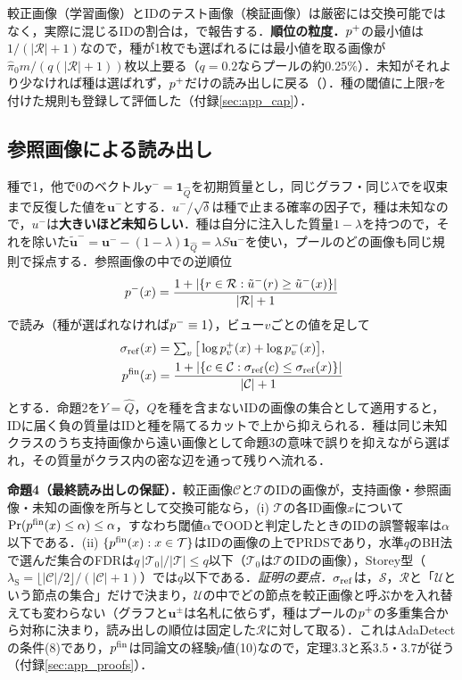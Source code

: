 較正画像（学習画像）とIDのテスト画像（検証画像）は厳密には交換可能ではなく，実際に混じるIDの割合は，で報告する．\textbf{順位の粒度．}$p^{+}$の最小値は$1/(|\mathcal{R}|+1)$なので，種が1枚でも選ばれるには最小値を取る画像が$\hat{\pi}_0 m/(q(|\mathcal{R}|+1))$枚以上要る（$q{=}0.2$ならプールの約$0.25\%$）．未知がそれより少なければ種は選ばれず，$p^{+}$だけの読み出しに戻る（）．種の閾値に上限$\tau$を付けた規則も登録して評価した（付録\ref{sec:app_cap}）．

\subsection{参照画像による読み出し}
\label{sec:ref}
\label{sec:xfit}
種で1，他で0のベクトル$\mathbf{y}^{-}=\mathbf{1}_{\hat{Q}}$を初期質量とし，同じグラフ・同じ$\lambda$でを収束まで反復した値を$\mathbf{u}^{-}$とする．$u^{-}/\sqrt{\delta}$は種で止まる確率の因子で，種は未知なので，$u^{-}$は\textbf{大きいほど未知らしい}．種は自分に注入した質量$1-\lambda$を持つので，それを除いた$\tilde{\mathbf{u}}^{-}=\mathbf{u}^{-}-(1-\lambda)\mathbf{1}_{\hat{Q}}=\lambda S\mathbf{u}^{-}$を使い，プールのどの画像も同じ規則で採点する．参照画像の中での逆順位
\begin{equation}
p^{-}(x)=\frac{1+|\{r\in\mathcal{R}:\tilde{u}^{-}(r)\ge\tilde{u}^{-}(x)\}|}{|\mathcal{R}|+1}
\label{eq:pneg}
\end{equation}
で読み（種が選ばれなければ$p^{-}\equiv1$），ビュー$v$ごとの値を足して
\begin{equation}
\begin{aligned}
\sigma_{\mathrm{ref}}(x)&=\textstyle\sum_{v}\big[\log p^{+}_v(x)+\log p^{-}_v(x)\big],\\
p^{\mathrm{fin}}(x)&=\frac{1+|\{c\in\mathcal{C}:\sigma_{\mathrm{ref}}(c)\le\sigma_{\mathrm{ref}}(x)\}|}{|\mathcal{C}|+1}
\end{aligned}
\label{eq:pfin}
\end{equation}
とする．命題2を$Y=\hat{Q}$，$Q$を種を含まないIDの画像の集合として適用すると，IDに届く負の質量はIDと種を隔てるカットで上から抑えられる．種は同じ未知クラスのうち支持画像から遠い画像として命題3の意味で誤りを抑えながら選ばれ，その質量がクラス内の密な辺を通って残りへ流れる．

\textbf{命題4（最終読み出しの保証）．}較正画像$\mathcal{C}$と$\mathcal{T}$のIDの画像が，支持画像・参照画像・未知の画像を所与として交換可能なら，(i) $\mathcal{T}$の各ID画像$x$について$\Pr(p^{\mathrm{fin}}(x)\le\alpha)\le\alpha$，すなわち閾値$\alpha$でOODと判定したときのIDの誤警報率は$\alpha$以下である．(ii) $\{p^{\mathrm{fin}}(x):x\in\mathcal{T}\}$はIDの画像の上でPRDSであり，水準$q$のBH法で選んだ集合のFDRは$q\,|\mathcal{T}_0|/|\mathcal{T}|\le q$以下（$\mathcal{T}_0$は$\mathcal{T}$のIDの画像），Storey型（$\lambda_{\mathrm{S}}=\lfloor|\mathcal{C}|/2\rfloor/(|\mathcal{C}|+1)$）では$q$以下である．\textit{証明の要点．}$\sigma_{\mathrm{ref}}$は，$\mathcal{S}$，$\mathcal{R}$と「$\mathcal{U}$という節点の集合」だけで決まり，$\mathcal{U}$の中でどの節点を較正画像と呼ぶかを入れ替えても変わらない（グラフと$\mathbf{u}^{\pm}$は名札に依らず，種はプールの$p^{+}$の多重集合から対称に決まり，読み出しの順位は固定した$\mathcal{R}$に対して取る）．これはAdaDetectの条件(8)であり，$p^{\mathrm{fin}}$は同論文の経験$p$値(10)なので，定理3.3と系3.5・3.7が従う（付録\ref{sec:app_proofs}）．

